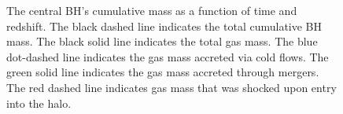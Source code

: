 \documentclass[manuscript]{aastex}
\begin{document}
\begin{figure}
\centerline{}
\caption[]{The central BH’s cumulative mass as a function of time and redshift. The black dashed line indicates the total cumulative BH mass. The black solid line indicates the total gas mass. The blue dot-dashed line indicates the gas mass accreted via cold flows. The green solid line indicates the gas mass accreted through mergers. The red dashed line indicates gas mass that was shocked upon entry into the halo.}
\label{h277allmassgas} 
\end{figure}
\end{document}

